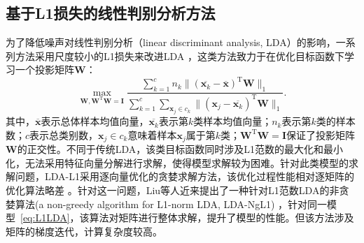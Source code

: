 \subsection{基于L1损失的线性判别分析方法}
为了降低噪声对线性判别分析（linear discriminant analysis, LDA）的影响，一系列方法采用尺度较小的L1损失来改进LDA \citep{zhong13}，这类方法致力于在优化目标函数下学习一个投影矩阵$\boldsymbol{W}$：
\begin{equation}\label{eq:L1LDA}
\max_{\boldsymbol{W},\boldsymbol{W}^\mathrm{T}\boldsymbol{W}=\boldsymbol{I}} \frac{\displaystyle \sum_{k=1}^c n_k\|(\overline{\boldsymbol{x}_k}-\boldsymbol{\overline{x}})^\mathrm{T}\boldsymbol{W} \|_1}{\displaystyle \sum_{k=1}^c \displaystyle \sum_{\boldsymbol{x}_{j} \in c_k}\|(\boldsymbol{x}_j-\overline{\boldsymbol{x}_k})^\mathrm{T}\boldsymbol{W} \|_1}.
\end{equation}
其中，$\overline{\boldsymbol{x}}$表示总体样本均值向量，$\overline{\boldsymbol{x}_k}$表示第$k$类样本均值向量；$n_k$表示第$k$类的样本数；$c$表示总类别数，$\boldsymbol{x}_{j} \in c_k$意味着样本$\boldsymbol{x}_j$属于第$k$类；$\boldsymbol{W}^\mathrm{T}\boldsymbol{W}=\boldsymbol{I}$保证了投影矩阵$\boldsymbol{W}$的正交性。不同于传统LDA，该类目标函数同时涉及L1范数的最大化和最小化，无法采用特征向量分解进行求解，使得模型求解较为困难。针对此类模型的求解问题，LDA-L1采用逐向量优化的贪婪求解方法，该优化过程性能相对逐矩阵的优化算法略差 \citep{liu16non}。针对这一问题，Liu等人近来提出了一种针对L1范数LDA的非贪婪算法(a non-greedy algorithm for L1-norm LDA, LDA-NgL1) \citep{liu16non}，针对同一模型~\eqref{eq:L1LDA}，该算法对矩阵进行整体求解，提升了模型的性能。但该方法涉及矩阵的梯度迭代，计算复杂度较高。


